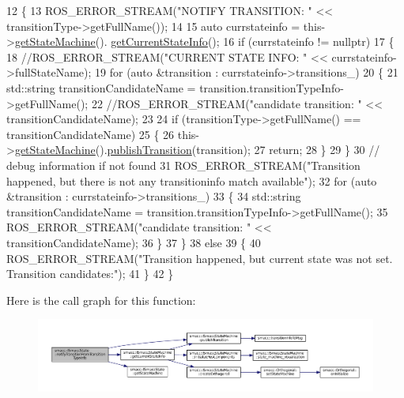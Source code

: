 \begin{DoxyCode}
12 \{
13     ROS\_ERROR\_STREAM(\textcolor{stringliteral}{"NOTIFY TRANSITION: "} << transitionType->getFullName());
14 
15     \textcolor{keyword}{auto} currstateinfo = this->\hyperlink{classsmacc_1_1ISmaccState_a562bb3f9a3ac16b8be71e4794c9e7523}{getStateMachine}().
      \hyperlink{classsmacc_1_1ISmaccStateMachine_a1c455c0f33506e59a7f4389e3fe99ffe}{getCurrentStateInfo}();
16     \textcolor{keywordflow}{if} (currstateinfo != \textcolor{keyword}{nullptr})
17     \{
18         \textcolor{comment}{//ROS\_ERROR\_STREAM("CURRENT STATE INFO: " << currstateinfo->fullStateName);}
19         \textcolor{keywordflow}{for} (\textcolor{keyword}{auto} &transition : currstateinfo->transitions\_)
20         \{
21             std::string transitionCandidateName = transition.transitionTypeInfo->getFullName();
22             \textcolor{comment}{//ROS\_ERROR\_STREAM("candidate transition: " << transitionCandidateName);}
23 
24             \textcolor{keywordflow}{if} (transitionType->getFullName() == transitionCandidateName)
25             \{
26                 this->\hyperlink{classsmacc_1_1ISmaccState_a562bb3f9a3ac16b8be71e4794c9e7523}{getStateMachine}().\hyperlink{classsmacc_1_1ISmaccStateMachine_ab61bff5b3c49c4bfc17972e2de8d4fd5}{publishTransition}(transition);
27                 \textcolor{keywordflow}{return};
28             \}
29         \}
30         \textcolor{comment}{// debug information if not found}
31         ROS\_ERROR\_STREAM(\textcolor{stringliteral}{"Transition happened, but there is not any transitioninfo match available"});
32         \textcolor{keywordflow}{for} (\textcolor{keyword}{auto} &transition : currstateinfo->transitions\_)
33         \{
34             std::string transitionCandidateName = transition.transitionTypeInfo->getFullName();
35             ROS\_ERROR\_STREAM(\textcolor{stringliteral}{"candidate transition: "} << transitionCandidateName);
36         \}
37     \}
38     \textcolor{keywordflow}{else}
39     \{
40         ROS\_ERROR\_STREAM(\textcolor{stringliteral}{"Transition happened, but current state was not set. Transition candidates:"});
41     \}
42 \}
\end{DoxyCode}


Here is the call graph for this function\+:
\nopagebreak
\begin{figure}[H]
\begin{center}
\leavevmode
\includegraphics[width=350pt]{classsmacc_1_1ISmaccState_a46ec42e07b8c68e8ddb7dd3472e91214_cgraph}
\end{center}
\end{figure}




